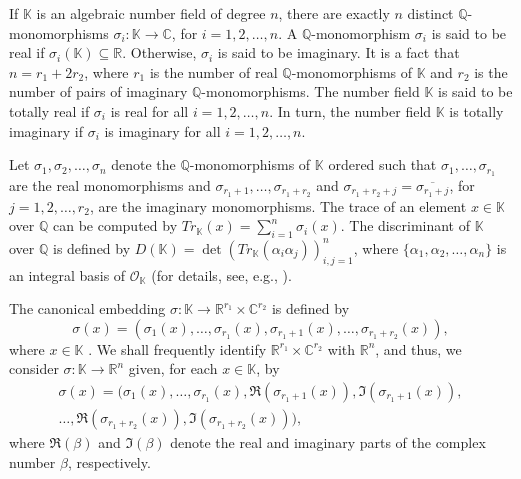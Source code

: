 \documentclass{amsart}
\begin{document}
If $\mathbb{K}$ is an algebraic number field of degree $n$, there are exactly $n$ distinct $\mathbb{Q}$-monomorphisms $\sigma_i:\mathbb{K}\rightarrow\mathbb{C}$, for $i=1,2,\ldots,n$. A $\mathbb{Q}$-monomorphism $\sigma_i$ is said to be real if $\sigma_i(\mathbb{K})\subseteq\mathbb{R}$. Otherwise, $\sigma_i$ is said to be imaginary. It is a fact that $n=r_1+2r_2$, where $r_1$ is the number of real $\mathbb{Q}$-monomorphisms of $\mathbb{K}$ and $r_2$ is the number of pairs of imaginary $\mathbb{Q}$-monomorphisms. The number field $\mathbb{K}$ is said to be totally real if $\sigma_i$ is real for all $i=1,2,\ldots,n$. In turn, the number field $\mathbb{K}$ is totally imaginary if $\sigma_i$ is imaginary for all $i=1,2,\ldots,n$. 

Let $\sigma_1,\sigma_2,\ldots,\sigma_n$ denote the $\mathbb{Q}$-monomorphisms of $\mathbb{K}$ ordered such that $\sigma_1,\ldots,\sigma_{r_1}$ are the real monomorphisms and $\sigma_{r_1+1},\ldots,\sigma_{r_1+r_2}$ and $\sigma_{r_1+r_2+j}=\overline{\sigma_{r_1+j}}$, for $j=1,2,\ldots,r_2$, are the imaginary monomorphisms. The trace of an element $x\in\mathbb{K}$ over $\mathbb{Q}$ can be computed by $Tr_{\mathbb{K}}(x)=\sum_{i=1}^n\sigma_i(x)$. The discriminant of $\mathbb{K}$ over $\mathbb{Q}$ is defined by $D(\mathbb{K})=\det(Tr_{\mathbb{K}}(\alpha_i\alpha_j))_{i,j=1}^n$, where $\{\alpha_1,\alpha_2,\ldots,\alpha_n\}$ is an integral basis of $\mathcal{O}_{\mathbb{K}}$ (for details, see, e.g., \cite{samuel}). 

The canonical embedding $\sigma:\mathbb{K}\rightarrow\mathbb{R}^{r_1}\times\mathbb{C}^{r_2}$ is defined by  \[ \sigma(x) = (\sigma_1(x),\ldots,\sigma_{r_1}(x),\sigma_{r_1+1}(x),\ldots,\sigma_{r_1+r_2}(x)), \] where $x\in\mathbb{K}$ \cite[Section 4.2]{samuel}. We shall frequently identify $\mathbb{R}^{r_1}\times\mathbb{C}^{r_2}$ with $\mathbb{R}^n$, and thus, we consider $\sigma:\mathbb{K}\rightarrow\mathbb{R}^{n}$ given, for each $x\in \mathbb{K}$, by %
\begin{multline*} \sigma(x) = (\sigma_1(x),\ldots,\sigma_{r_1}(x),\mathfrak{R}(\sigma_{r_1+1}(x)),\mathfrak{I}(\sigma_{r_1+1}(x)),\\  \ldots,\mathfrak{R}(\sigma_{r_1+r_2}(x)),\mathfrak{I}(\sigma_{r_1+r_2}(x))), \end{multline*}
where $\mathfrak{R}(\beta)$ and $\mathfrak{I}(\beta)$ denote the real and imaginary parts of the complex number $\beta$, respectively.
\end{document}
